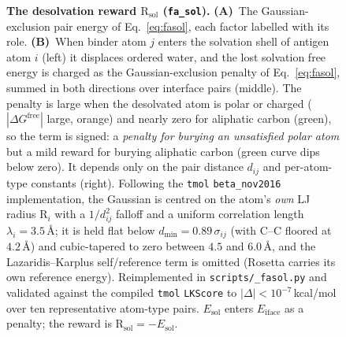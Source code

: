 \documentclass[11pt]{article}
\newcommand{\R}{\mathrm{R}}
\newcommand{\ttk}[1]{\texttt{\small #1}}
\begin{document}
\begin{figure}[htbp]
{%
}
\caption{\textbf{The desolvation reward $\R_{\mathrm{sol}}$ (\ttk{fa\_sol}).} \textbf{(A)}~The
Gaussian-exclusion pair energy of Eq.\ \ref{eq:fasol}, each factor labelled with its role.
\textbf{(B)}~When binder atom $j$
enters the solvation shell of antigen atom $i$ (left) it displaces ordered water, and the lost
solvation free energy is charged as the Gaussian-exclusion penalty of Eq.\ \ref{eq:fasol}, summed in
both directions over interface pairs (middle). The penalty is large when the desolvated atom is polar
or charged ($|\Delta G^{\mathrm{free}}|$ large, orange) and nearly zero for aliphatic carbon (green),
so the term is signed: a \emph{penalty for burying an unsatisfied polar atom} but a mild reward for
burying aliphatic carbon (green curve dips below zero). It depends only on the pair distance
$d_{ij}$ and per-atom-type constants (right). Following the \ttk{tmol} \ttk{beta\_nov2016}
implementation, the Gaussian is centred on the atom's \emph{own} LJ radius $\R_i$ with a $1/d_{ij}^2$
falloff and a uniform correlation length $\lambda_i{=}3.5$\,\AA; it is held flat below
$d_{\min}{=}0.89\,\sigma_{ij}$ (with C--C floored at $4.2$\,\AA) and cubic-tapered to zero between
$4.5$ and $6.0$\,\AA, and the Lazaridis--Karplus self/reference term is omitted (Rosetta carries its
own reference energy). Reimplemented in \ttk{scripts/\_fasol.py} and validated against the compiled
\ttk{tmol} \ttk{LKScore} to $|\Delta|<10^{-7}$\,kcal/mol over ten representative atom-type pairs.
$E_{\mathrm{sol}}$ enters $E_{\mathrm{iface}}$ as a penalty; the reward is
$\R_{\mathrm{sol}}=-E_{\mathrm{sol}}$.}
\label{fig:fasol}
\end{figure}
\end{document}
